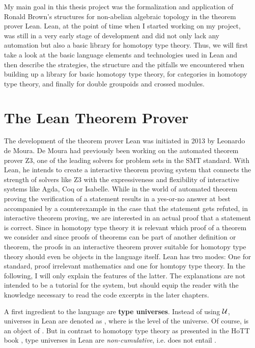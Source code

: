 My main goal in this thesis project was the formalization and application of
Ronald Brown's structures for non-abelian algebraic topology in the theorem prover
Lean.
Lean, at the point of time when I started working on my project, was still in a very early
stage of development and did not only lack any automation but also a basic library
for homotopy type theory.
Thus, we will first take a look at the basic language elements and technologies
used in Lean and then describe the strategies, the structure and the pitfalls
we encountered when building up a library for basic homotopy type theory,
for categories in homotopy type theory, and finally for double groupoids and
crossed modules.

\section{The Lean Theorem Prover}

The development of the theorem prover Lean was initiated in 2013 by Leo\-nar\-do
de Moura.
De Moura had previously been working on the automated theorem prover Z3, one of the leading
solvers for problem sets in the SMT standard.
With Lean, he intends to create a interactive theorem proving system that connects
the strength of solvers like Z3 with the expressiveness and flexibility of
interactive systems like Agda, Coq or Isabelle.
While in the world of automated theorem proving the verification of a statement
results in a yes-or-no answer at best accompanied by a counterexample in the case
that the statement gets refuted, in interactive theorem proving, we are interested
in an actual proof that a statement is correct.
Since in homotopy type theory it is relevant which proof of a theorem we consider
and since proofs of theorems can be part of another definition or theorem,
the proofs in an interactive theorem prover suitable for homotopy type theory
should even be objects in the language itself.
Lean has two modes: One for standard, proof irrelevant mathematics and one for
homtopy type theory.
In the following, I will only explain the features of the latter.
The explanations are not intended to be a tutorial for the system, but should
equip the reader with the knowledge necessary to read the code excerpts in the
later chapters.

A first ingredient to the language are \textbf{type universes}.
Instead of using $\mathcal{U}$, universes in Lean are denoted as , where
 is the level of the universe.
Of course,  is an object of .
But in contrast to homotopy type theory as presented in the HoTT book \cite{hottbook},
type universes in Lean are \emph{non-cumulative}, 
i.e.  does not entail .

